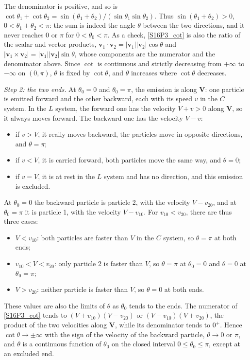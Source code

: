 \begin{problem}[title={Range of angles between two decay products}]
{The denominator is positive, and so is $\cot{\theta_1}+\cot{\theta_2} = \sin{(\theta_1+\theta_2)}/(\sin{\theta_1}\sin{\theta_2})$. Thus $\sin{(\theta_1+\theta_2)}>0$, \ie $0<\theta_1+\theta_2<\pi$: the sum is indeed the angle $\theta$ between the two directions, and it never reaches $0$ or $\pi$ for $0<\theta_0<\pi$. As a check, \eqref{S16P3_cot} is also the ratio of the scalar and vector products, $\mathbf{v}_1 \cdot \mathbf{v}_2 = |\mathbf{v}_1||\mathbf{v}_2|\cos{\theta}$ and $|\mathbf{v}_1 \times \mathbf{v}_2| = |\mathbf{v}_1||\mathbf{v}_2|\sin{\theta}$, whose components are the numerator and the denominator above. Since $\cot$ is continuous and strictly decreasing from $+\infty$ to $-\infty$ on $(0,\pi)$, $\theta$ is fixed by $\cot{\theta}$, and $\theta$ increases where $\cot{\theta}$ decreases.

\textit{Step 2: the two ends.} At $\theta_0 = 0$ and $\theta_0 = \pi$, the emission is along $\mathbf{V}$: one particle is emitted forward and the other backward, each with its speed $v$ in the $C$ system. In the $L$ system, the forward one has the velocity $V+v>0$ along $\mathbf{V}$, so it always moves forward. The backward one has the velocity $V-v$:
\begin{itemize}
    \item if $v>V$, it really moves backward, the particles move in opposite directions, and $\theta = \pi$;
    \item if $v<V$, it is carried forward, both particles move the same way, and $\theta = 0$;
    \item if $v=V$, it is at rest in the $L$ system and has no direction, and this emission is excluded.
\end{itemize}
At $\theta_0 = 0$ the backward particle is particle 2, with the velocity $V-v_{20}$, and at $\theta_0 = \pi$ it is particle 1, with the velocity $V-v_{10}$. For $v_{10}<v_{20}$, there are thus three cases:
\begin{itemize}
    \item $V<v_{10}$: both particles are faster than $V$ in the $C$ system, so $\theta = \pi$ at both ends;
    \item $v_{10}<V<v_{20}$: only particle 2 is faster than $V$, so $\theta = \pi$ at $\theta_0 = 0$ and $\theta = 0$ at $\theta_0 = \pi$;
    \item $V>v_{20}$: neither particle is faster than $V$, so $\theta = 0$ at both ends.
\end{itemize}
These values are also the limits of $\theta$ as $\theta_0$ tends to the ends. The numerator of \eqref{S16P3_cot} tends to $(V+v_{10})(V-v_{20})$ or $(V-v_{10})(V+v_{20})$, the product of the two velocities along $\mathbf{V}$, while its denominator tends to $0^+$. Hence $\cot{\theta} \rightarrow \pm\infty$ with the sign of the velocity of the backward particle, \ie $\theta \rightarrow 0$ or $\pi$, and $\theta$ is a continuous function of $\theta_0$ on the closed interval $0 \leq \theta_0 \leq \pi$, except at an excluded end.

}
\end{problem}
